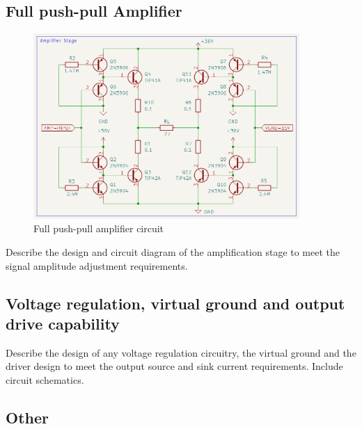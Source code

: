 \documentclass[11pt,a4paper]{article}
\begin{document}
\subsection{Full push-pull Amplifier}

\begin{figure}[H]
	\begin{center}
		\includegraphics[width=0.9\textwidth]{figures/hardware/schematics/amplifier-circuit.png}
		\caption{Full push-pull amplifier circuit}
		\label{fig:full-push-pull-amplifier-circuit}
	\end{center}
\end{figure}


Describe the design and circuit diagram of the amplification stage to meet the signal amplitude adjustment requirements.

\subsection{Voltage regulation, virtual ground and output drive capability}

Describe the design of any voltage regulation circuitry, the virtual ground and the driver design to meet the output source and sink current requirements. Include circuit schematics.

\subsection{Other}
\end{document}
